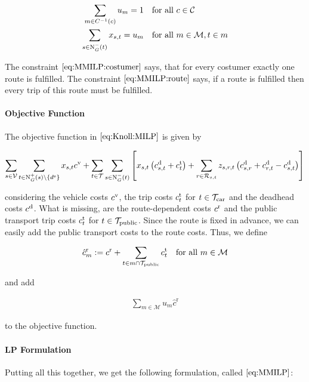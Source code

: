 \begin{align}
	\sum_{m\in C^{-1}(c)} u_m = 1 &&& \text{for all } c\in\mathcal{C} \label{eq:MMILP:costumer} \\
	\sum_{s\in\operatorname{N}_G^-(t)} x_{s,t} = u_m &&& \text{for all } m\in\mathcal{M}, t\in m \label{eq:MMILP:route}
\end{align}

The constraint $\eqref{eq:MMILP:costumer}$ says, that for every costumer exactly one route is fulfilled. The constraint $\eqref{eq:MMILP:route}$ says, if a route is fulfilled then every trip of this route must be fulfilled.

\paragraph{Objective Function} \parfill

The objective function in $\eqref{eq:Knoll:MILP}$ is given by

\begin{align*}
	\sum_{s\in\mathcal{V}} \sum_{t\in\operatorname{N}_G^+(s)\backslash\{d^{\operatorname{e}}\}} x_{s,t}c^{\operatorname{v}}	+ \sum_{t\in\mathcal{T}} \sum_{s\in\operatorname{N}_G^-(t)} \left[x_{s,t}\left(c^{\operatorname{d}}_{s,t}+c^{\operatorname{t}}_{t}\right) + \sum_{r\in\mathcal{R}_{s,t}} z_{s,r,t}\left(c^{\operatorname{d}}_{s,r}+c^{\operatorname{d}}_{r,t}-c^{\operatorname{d}}_{s,t}\right)\right]
\end{align*}

considering the vehicle costs $c^{\operatorname{v}}$, the trip costs $c^{\operatorname{t}}_t$ for $t\in\mathcal{T}_{\operatorname{car}}$ and the deadhead costs $c^{\operatorname{d}}$. What is missing, are the route-dependent costs $c^{\operatorname{r}}$ and the public transport trip costs $c^{\operatorname{t}}_t$ for $t\in\mathcal{T}_{\operatorname{public}}$. Since the route is fixed in advance, we can easily add the public transport costs to the route costs. Thus, we define

\begin{align*}
	\hat{c}^{\operatorname{r}}_m := c^{\operatorname{r}} + \sum_{t\in m\cap\mathcal{T}_{\operatorname{public}}}c^{\operatorname{t}}_t && \text{for all } m\in\mathcal{M}
\end{align*}

and add

\begin{align*}
	\sum_{m\in\mathcal{M}} u_m\hat{c}^{\operatorname{r}}
\end{align*}

to the objective function.

\paragraph{LP Formulation} \parfill

Putting all this together, we get the following formulation, called $\eqref{eq:MMILP}$:

